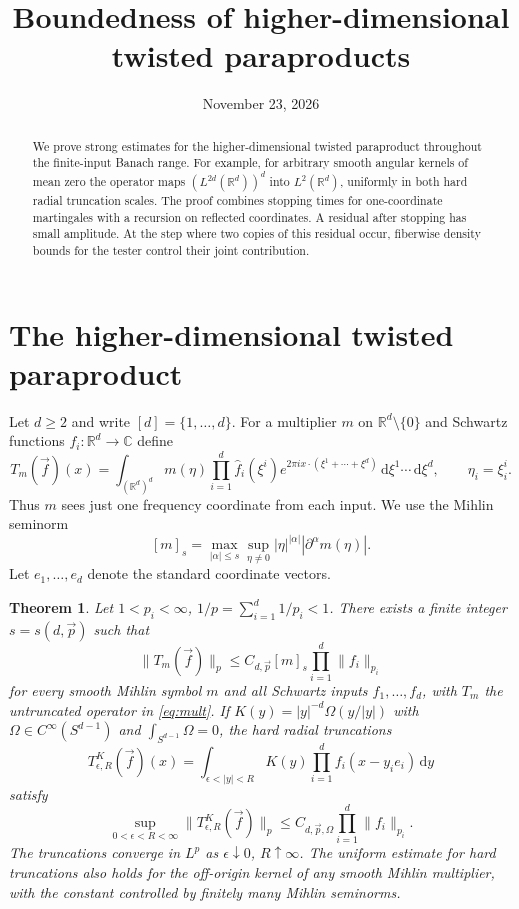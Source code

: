 \documentclass[11pt]{article}
\title{Boundedness of higher-dimensional twisted paraproducts}
\author{}
\date{November 23, 2026}
\newtheorem{theorem}{Theorem}[section]
\newcommand{\R}{\mathbb R}
\newcommand{\dd}{\,\mathrm d}
\begin{document}
\maketitle

\begin{abstract}
We prove strong estimates for the higher-dimensional twisted paraproduct
throughout the finite-input Banach range.
For example, for arbitrary smooth angular kernels of mean zero the
operator maps \((L^{2d}(\mathbb R^d))^d\) into \(L^2(\mathbb R^d)\),
uniformly in both hard radial truncation scales. The proof combines
stopping times for one-coordinate martingales with a recursion on
reflected coordinates. A residual after stopping has small amplitude.
At the step where two copies of this residual occur, fiberwise density
bounds for the tester control their joint contribution.
\end{abstract}

\section{The higher-dimensional twisted paraproduct}
Let \(d\ge2\) and write \([d]=\{1,\ldots,d\}\). For a multiplier
\(m\) on \(\R^d\setminus\{0\}\) and Schwartz functions
\(f_i:\R^d\to\mathbb C\) define
\begin{equation}\label{eq:mult}
 T_m(\vec f)(x)=\int_{(\R^d)^d}
    m(\eta)\prod_{i=1}^d\widehat f_i(\xi^i)
       e^{2\pi i x\cdot(\xi^1+\cdots+\xi^d)}
                  \dd\xi^1\cdots\dd\xi^d,\qquad \eta_i=\xi_i^i .
\end{equation}
Thus \(m\) sees just one frequency coordinate from each input. We use the Mihlin seminorm
\[
  [m]_s=\max_{|\alpha|\le s}\sup_{\eta\ne0}
                        |\eta|^{|\alpha|}|\partial^\alpha m(\eta)|.
\]
Let \(e_1,\ldots,e_d\) denote the standard coordinate vectors.
\begin{theorem}\label{thm:main}
Let \(1<p_i<\infty\), \(1/p=\sum_{i=1}^d1/p_i<1\). There exists
a finite integer \(s=s(d,\vec p)\) such that
\begin{equation}\label{eq:bound}
       \|T_m(\vec f)\|_{p}\le C_{d,\vec p}[m]_s
                        \prod_{i=1}^d\|f_i\|_{p_i}
\end{equation}
for every smooth Mihlin symbol \(m\) and all Schwartz inputs
\(f_1,\ldots,f_d\), with \(T_m\) the untruncated operator in \eqref{eq:mult}.
If \(K(y)=|y|^{-d}\Omega(y/|y|)\) with \(\Omega\in C^\infty(S^{d-1})\)
and \(\int_{S^{d-1}}\Omega=0\), the hard radial truncations
\begin{equation}\label{eq:hard}
  T^K_{\epsilon,R}(\vec f)(x)=\int_{\epsilon<|y|<R}
       K(y)\prod_{i=1}^d f_i(x-y_i e_i)\dd y
\end{equation}
satisfy
\[
    \sup_{0<\epsilon<R<\infty}\|T^K_{\epsilon,R}(\vec f)\|_p
            \le C_{d,\vec p,\Omega}\prod_{i=1}^d\|f_i\|_{p_i}.
\]
The truncations converge in \(L^p\) as \(\epsilon\downarrow0\), \(R\uparrow\infty\).
The uniform estimate for hard truncations also holds for the
off-origin kernel of any smooth Mihlin multiplier, with the constant
controlled by finitely many Mihlin seminorms.
\end{theorem}
\end{document}
